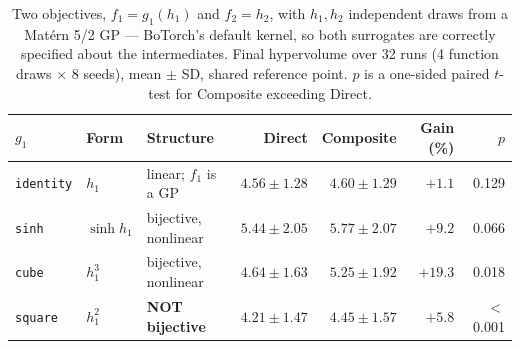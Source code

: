 \begin{table}[H]
\centering\small
\caption{Two objectives, $f_1=g_1(h_1)$ and $f_2=h_2$, with $h_1,h_2$ independent
draws from a Mat\'ern 5/2 GP --- BoTorch's default kernel, so both surrogates are
correctly specified about the intermediates.  Final hypervolume over 32 runs
(4 function draws $\times$ 8 seeds), mean $\pm$ SD, shared reference point.
$p$ is a one-sided paired $t$-test for Composite exceeding Direct.}
\label{tab:mobo}
\begin{tabular}{@{}l l l r r r r@{}}
\toprule
$g_1$ & Form & Structure & Direct & Composite & Gain (\%) & $p$ \\
\midrule
\texttt{identity} & $h_1$ & linear; $f_1$ is a GP & $4.56\pm1.28$ & $4.60\pm1.29$ & $+1.1$ & 0.129 \\
\texttt{sinh} & $\sinh h_1$ & bijective, nonlinear & $5.44\pm2.05$ & $5.77\pm2.07$ & $+9.2$ & 0.066 \\
\texttt{cube} & $h_1^3$ & bijective, nonlinear & $4.64\pm1.63$ & $5.25\pm1.92$ & $+19.3$ & 0.018 \\
\texttt{square} & $h_1^2$ & \textbf{NOT bijective} & $4.21\pm1.47$ & $4.45\pm1.57$ & $+5.8$ & $<$0.001 \\
\bottomrule
\end{tabular}
\end{table}
